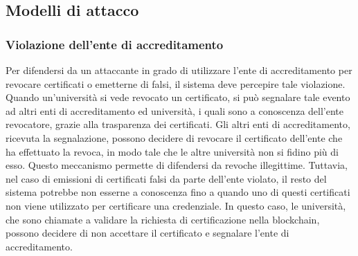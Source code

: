 \documentclass[a4paper,12pt]{article}
\begin{document}
\subsection{Modelli di attacco}
\subsubsection{Violazione dell’ente di accreditamento}
Per difendersi da un attaccante in grado di utilizzare l'ente di accreditamento per revocare certificati o emetterne di falsi, il sistema deve percepire tale violazione. 
Quando un'università si vede revocato un certificato, si può segnalare tale evento ad altri enti di accreditamento ed università, i quali sono a conoscenza dell'ente revocatore, grazie alla trasparenza dei certificati.
Gli altri enti di accreditamento, ricevuta la segnalazione, possono decidere di revocare il certificato dell'ente che ha effettuato la revoca, in modo tale che le altre università non si fidino più di esso. Questo meccanismo permette di difendersi da revoche illegittime. 
\newline Tuttavia, nel caso di emissioni di certificati falsi da parte dell'ente violato, il resto del sistema potrebbe non esserne a conoscenza fino a quando uno di questi certificati non viene utilizzato per certificare una credenziale. In questo caso, le università, che sono chiamate a validare la richiesta di certificazione nella blockchain, possono decidere di non accettare il certificato e segnalare l'ente di accreditamento.
\end{document}

